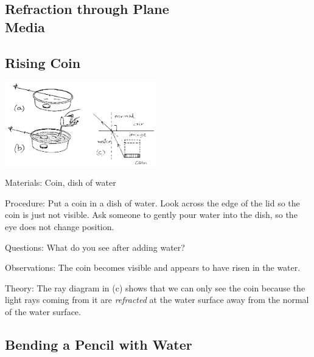 \begin{multicols}{2}

\section*{Refraction through Plane \hfill \\ Media} 


\subsection{Rising Coin}

\begin{center}
\includegraphics[width=0.49\textwidth]{./img/source/rising-coin.png}
\end{center}

\begin{description*}
\item[Materials:]{Coin, dish of water}
\item[Procedure:]{Put a coin in a dish of water. Look across the edge of the lid so the coin is just not visible. Ask someone to gently pour water into the dish, so the eye does not change position.}
\item[Questions:]{What do you see after adding water?}
\item[Observations:]{The coin becomes visible and appears to have risen in the water.}
\item[Theory:]{The ray diagram in (c) shows that we can only see the coin because the light rays coming from it are \emph{refracted} at the water surface away from the normal of the water surface.}
\end{description*}

\subsection{Bending a Pencil with Water}


\end{multicols}
